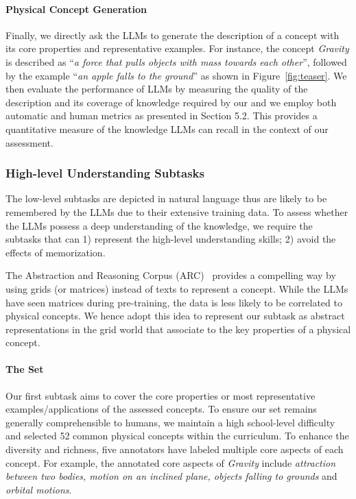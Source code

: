 \paragraph{Physical Concept Generation}
Finally, we directly ask the LLMs to generate the description of a concept with its core properties and representative examples.
For instance, the concept \emph{Gravity} is described as ``\emph{a force that pulls objects with mass towards each other}'', followed by the example ``\emph{an apple falls to the ground}'' as shown in Figure~\ref{fig:teaser}.
We then evaluate the performance of LLMs by measuring the quality of the description and its coverage of knowledge required by our \datasetname and we employ both automatic and human metrics as presented in Section 5.2.
This provides a quantitative measure of the knowledge LLMs can recall in the context of our assessment. 







\subsubsection{High-level Understanding Subtasks}
\label{ssec:high-level}
The low-level subtasks are depicted in natural language thus are likely to be remembered by the LLMs due to their extensive training data.
To assess whether the LLMs possess a deep understanding of the knowledge, we require the subtasks that can 1) represent the high-level understanding skills; 2) avoid the effects of memorization. 

The Abstraction and Reasoning Corpus (ARC)~\cite{chollet2019measure} provides a compelling way by using grids (or matrices) instead of texts to represent a concept. While the LLMs have seen matrices during pre-training, the data is less likely to be correlated to physical concepts. We hence adopt this idea to represent our subtask as abstract representations in the grid world that associate to the key properties of a physical concept. 

\paragraph{The \coredataset Set}

Our first subtask aims to cover the core properties or most representative examples/applications of the assessed concepts.
To ensure our set remains generally comprehensible to humans, we maintain a high school-level difficulty and selected 52 common physical concepts within the curriculum.
To enhance the diversity and richness, five annotators have labeled multiple core aspects of each concept. 
For example, the annotated core aspects of \emph{Gravity} include \emph{attraction between two bodies, motion on an inclined plane, objects falling to grounds} and \emph{orbital motions}.



